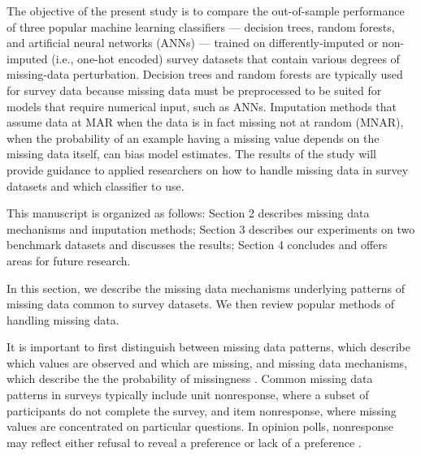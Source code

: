 \documentclass[10pt]{book}
\theoremstyle{definition}
\begin{document}
The objective of the present study is to compare the out-of-sample performance of three popular machine learning classifiers --- decision trees, random forests, and artificial neural networks (ANNs) --- trained on differently-imputed or non-imputed (i.e., one-hot encoded) survey datasets that contain various degrees of missing-data perturbation. Decision trees and random forests are typically used for survey data because missing data must be preprocessed to be suited for models that require numerical input, such as ANNs. Imputation methods that assume data at MAR when the data is in fact missing not at random (MNAR), when the probability of an example having a missing value depends on the missing data itself, can bias model estimates. The results of the study will provide guidance to applied researchers on how to handle missing data in survey datasets and which classifier to use. 

This manuscript is organized as follows: Section 2 describes missing data mechanisms and imputation methods; Section 3 describes our experiments on two benchmark datasets and discusses the results; Section 4 concludes and offers areas for future research. 

\par

\lhead[\footnotesize\thepage\fancyplain{}\leftmark]{}\rhead[]{\fancyplain{}\rightmark\footnotesize\thepage}%

\setcounter{chapter}{2}
\setcounter{equation}{0} %

In this section, we describe the missing data mechanisms underlying patterns of missing data common to survey datasets. We then review popular methods of handling missing data.

\par
{}

It is important to first distinguish between missing data patterns, which describe which values are observed and which are missing, and missing data mechanisms, which describe the the probability of missingness  \citep[Chap.~1]{little2014}. Common missing data patterns in surveys typically include unit nonresponse, where a subset of participants do not complete the survey, and item nonresponse, where missing values are concentrated on particular questions. In opinion polls, nonresponse may reflect either refusal to reveal a preference or lack of a preference \citep{de2003prevention}. 
\end{document}
